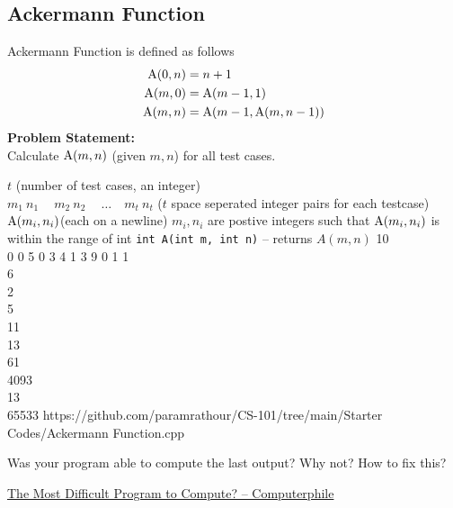 \subsection{Ackermann Function}
Ackermann Function is defined as follows
\begin{equation}
	\begin{aligned}
		\operatorname{A}(0,n)&=n+1\\
		\operatorname{A}(m,0)&=\operatorname{A}(m-1,1)\\
		\operatorname{A}(m,n)&=\operatorname{A}(m-1,\operatorname{A}(m,n-1))
	\end{aligned}
\end{equation}
\textbf{Problem Statement:}\\
Calculate $\operatorname{A}(m,n)$ (given $m,n$) for all test cases.
\begin{testcasesFunction}
	{$t$ \hfill(number of test cases, an integer)\\
	$m_1\ n_1\ \quad m_2\ n_2\ \quad \ldots\quad m_t\ n_t$ \hfill($t$ space seperated integer pairs for each testcase)}
	{$\operatorname{A}(m_i,n_i)$\hfill(each on a newline)}
	{$m_i,n_i$ are postive integers such that $\operatorname{A}(m_i,n_i)$ is within the range of int}
	{\texttt{int A(int m, int n)} -- returns $A(m,n)$}
	{10\\0 0 5 0 3 4 1 3 9 0 1}
	{1\\6\\2\\5\\11\\13\\61\\4093\\13\\65533}
	{https://github.com/paramrathour/CS-101/tree/main/Starter Codes/Ackermann Function.cpp}
\end{testcasesFunction}
\begin{noteI}
	Was your program able to compute the last output? Why not? How to fix this?
\end{noteI}
\begin{funvideo}
\href{https://youtu.be/i7sm9dzFtEI}{The Most Difficult Program to Compute? -- Computerphile}
\end{funvideo}
